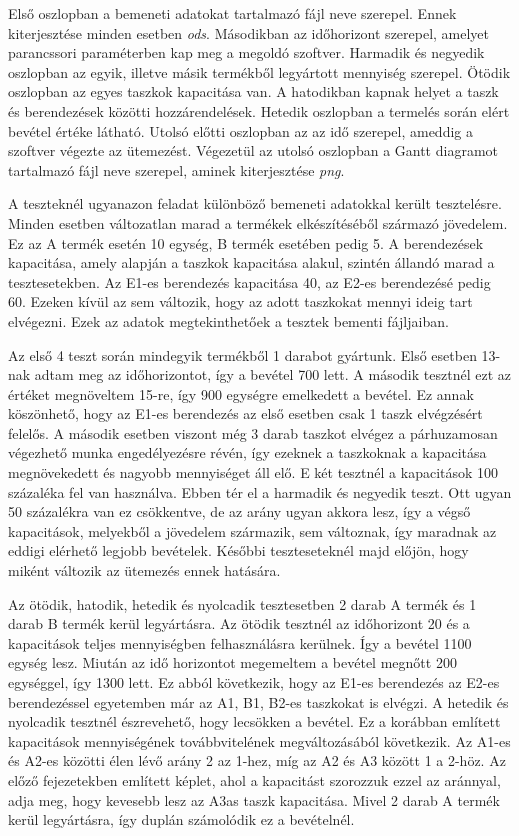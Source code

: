 Első oszlopban a bemeneti adatokat tartalmazó fájl neve szerepel. Ennek kiterjesztése minden esetben \textit{ods}. Másodikban az időhorizont szerepel, amelyet parancssori paraméterben kap meg a megoldó szoftver. Harmadik és negyedik oszlopban az egyik, illetve másik termékből legyártott mennyiség szerepel. Ötödik oszlopban az egyes taszkok kapacitása van. A hatodikban kapnak helyet a taszk és berendezések közötti hozzárendelések. Hetedik oszlopban a termelés során elért bevétel értéke látható. Utolsó előtti oszlopban az az idő szerepel, ameddig a szoftver végezte az ütemezést. Végezetül az utolsó oszlopban a Gantt diagramot tartalmazó fájl neve szerepel, aminek kiterjesztése \textit{png}.

A teszteknél ugyanazon feladat különböző bemeneti adatokkal került tesztelésre. Minden esetben változatlan marad a termékek elkészítéséből származó jövedelem. Ez az A termék esetén 10 egység, B termék esetében pedig 5. A berendezések kapacitása, amely alapján a taszkok kapacitása alakul, szintén állandó marad a tesztesetekben. Az E1-es berendezés kapacitása 40, az E2-es berendezésé pedig 60. Ezeken kívül az sem változik, hogy az adott taszkokat mennyi ideig tart elvégezni. Ezek az adatok megtekinthetőek a tesztek bementi fájljaiban.

Az első 4 teszt során mindegyik termékből 1 darabot gyártunk. Első esetben 13-nak adtam meg az időhorizontot, így a bevétel 700 lett. A második tesztnél ezt az értéket megnöveltem 15-re, így 900 egységre emelkedett a bevétel. Ez annak köszönhető, hogy az E1-es berendezés az első esetben csak 1 taszk elvégzésért felelős. A második esetben viszont még 3 darab taszkot elvégez a párhuzamosan végezhető munka engedélyezésre révén, így ezeknek a  taszkoknak a kapacitása megnövekedett és nagyobb mennyiséget áll elő. E két tesztnél a kapacitások 100 százaléka fel van használva. Ebben tér el a harmadik és negyedik teszt. Ott ugyan 50 százalékra van ez csökkentve, de az arány ugyan akkora lesz, így a végső kapacitások, melyekből a jövedelem származik, sem változnak, így maradnak az eddigi elérhető legjobb bevételek. Későbbi teszteseteknél majd előjön, hogy miként változik az ütemezés ennek hatására.

Az ötödik, hatodik, hetedik és nyolcadik tesztesetben 2 darab A termék és 1 darab B termék kerül legyártásra. Az ötödik tesztnél az időhorizont 20 és a kapacitások teljes mennyiségben felhasználásra kerülnek. Így a bevétel 1100 egység lesz. Miután az idő horizontot megemeltem a bevétel megnőtt 200 egységgel, így 1300 lett. Ez abból következik, hogy az E1-es berendezés az E2-es berendezéssel egyetemben már az A1, B1, B2-es taszkokat is elvégzi. A hetedik és nyolcadik tesztnél észrevehető, hogy lecsökken a bevétel. Ez a korábban említett kapacitások mennyiségének továbbvitelének megváltozásából következik. Az A1-es és A2-es közötti élen lévő arány 2 az 1-hez, míg az A2 és A3 között 1 a 2-höz. Az előző fejezetekben említett képlet, ahol a kapacitást szorozzuk ezzel az aránnyal, adja meg, hogy kevesebb lesz az A3as taszk kapacitása. Mivel 2 darab A termék kerül legyártásra, így duplán számolódik ez a bevételnél. 


